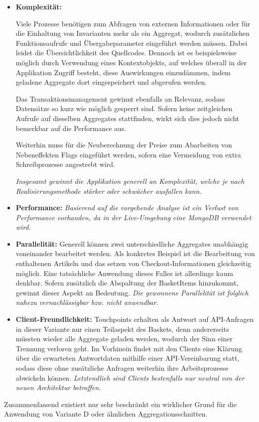 \begin{itemize}[topsep=-2pt]
	\item \textbf{Komplexität: } {Viele Prozesse benötigen zum Abfragen von externen Informationen oder für die Einhaltung von Invarianten mehr als ein Aggregat, wodurch zusätzlichen Funktionsaufrufe und Übergabeparameter eingeführt werden müssen. Dabei leidet die Übersichtlichkeit des Quellcodes. Dennoch ist es beispielsweise möglich durch Verwendung eines Kontextobjekts, auf welches überall in der Applikation Zugriff besteht, diese Auswirkungen einzudämmen, indem geladene Aggregate dort eingespeichert und abgerufen werden.
		
	Das Transaktionsmanagement gewinnt ebenfalls an Relevanz, sodass Datensätze so kurz wie möglich gesperrt sind. Sofern keine zeitgleichen Aufrufe auf dieselben Aggregates stattfinden, wirkt sich dies jedoch nicht bemerkbar auf die Performance aus. 
	
	Weiterhin muss für die Neuberechnung der Preise zum Abarbeiten von Nebeneffekten Flags eingeführt werden, sofern eine Vermeidung von extra Schreibprozesse angestrebt wird. 
	
	\emph{Insgesamt gewinnt die Applikation generell an Komplexität, welche je nach Realisierungsmethode stärker oder schwächer ausfallen kann.}}

	\item \textbf{Performance: } { \emph{Basierend auf die vorgehende Analyse ist ein Verlust von Performance vorhanden, da in der Live-Umgebung eine MongoDB verwendet wird.} }
	
	\item \textbf{Parallelität: } { Generell können zwei unterschiedliche Aggregates unabhängig voneinander bearbeitet werden. Als konkretes Beispiel ist die Bearbeitung von enthaltenen Artikeln und das setzen von Checkout-Informationen gleichzeitig möglich. Eine tatsächliche Anwendung dieses Falles ist allerdings kaum denkbar. Sofern zusätzlich die Abspaltung der BasketItems hinzukommt, gewinnt dieser Aspekt an Bedeutung. \emph{Die gewonnene Parallelität ist folglich nahezu vernachlässigbar bzw. nicht anwendbar.}}
	\item \textbf{Client-Freundlichkeit: } { Touchpoints erhalten als Antwort auf API-Anfragen in dieser Variante nur einen Teilaspekt des Baskets, denn andererseits müssten wieder alle Aggregate geladen werden, wodurch der Sinn einer Trennung verloren geht. Im Vorhinein findet mit den Clients eine Klärung über die erwarteten Antwortdaten mithilfe einer API-Vereinbarung statt, sodass diese ohne zusätzliche Anfragen weiterhin ihre Arbeitsprozesse abwickeln können. \emph{Letztendlich sind Clients bestenfalls nur neutral von der neuen Architektur betroffen.}}
\end{itemize}

Zusammenfassend existiert nur sehr beschränkt ein wirklicher Grund für die Anwendung von Variante D oder ähnlichen Aggregationsschnitten.